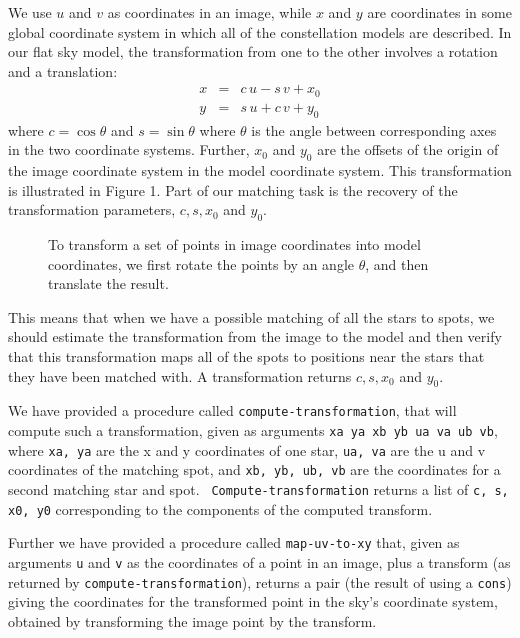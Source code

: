 We use $u$ and $v$ as coordinates in an image, while $x$ and $y$ are
coordinates in some global coordinate system in which all of the
constellation models are described.  In our flat sky model, the
transformation from one to the other involves a rotation and a
translation:
\[
\begin{array}{lll}
x & = & c\, u - s\, v + x_0 \\
y & = & s\, u + c\, v + y_0
\end{array}
\]
where $c= \cos \theta$ and $s = \sin \theta$ where $\theta$ is the
angle between corresponding axes in the two coordinate systems.
Further, $x_0$ and $y_0$ are the offsets of the origin of the image
coordinate system in the model coordinate system.  This transformation
is illustrated in Figure 1. Part of our matching task is the recovery
of the transformation parameters, $c, s, x_0$ and $y_0$.

\begin{figure}
\vspace{2.5 in}
\caption{To transform a set of points in image coordinates into
model coordinates, we first rotate the points by an angle $\theta$, and
then translate the result.}
\end{figure}

This means
that when we have a possible matching of all the stars to spots, we should
estimate the transformation from the image to the model and then verify that
this transformation maps all of the spots to positions near the stars that they
have been matched with.  A transformation returns $c, s, x_0$ and $y_0$.

We have provided a procedure called {\tt compute-transformation}, that will
compute such a transformation, given as arguments {\tt xa ya xb yb ua va ub
vb}, where {\tt xa, ya} are the x and y coordinates of one star, {\tt ua, va}
are the u and v coordinates of the matching spot, and {\tt xb, yb, ub, vb} are
the coordinates for a second matching star and spot.  {\tt
Compute-transformation} returns a list of {\tt c, s, x0, y0} corresponding to
the components of the computed transform.

Further we have provided a procedure called {\tt map-uv-to-xy} that,
given as arguments {\tt u} and {\tt v} as the coordinates of a point
in an image, plus a transform (as returned by {\tt compute-transformation}), 
returns a pair (the result of using a {\tt cons}) giving the
coordinates
for the transformed point in the sky's
coordinate system, obtained by transforming the image point by the
transform.

